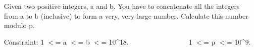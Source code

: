 Given two positive integers, a and b. You have to concatenate all the integers from a to b (inclusive) to form a very, very large number. Calculate this number modulo p.

Constraint: 1 $<$= a $<$= b $<$= 10\textasciicircum18. 
                 1 $<$= p $<$= 10\textasciicircum9.